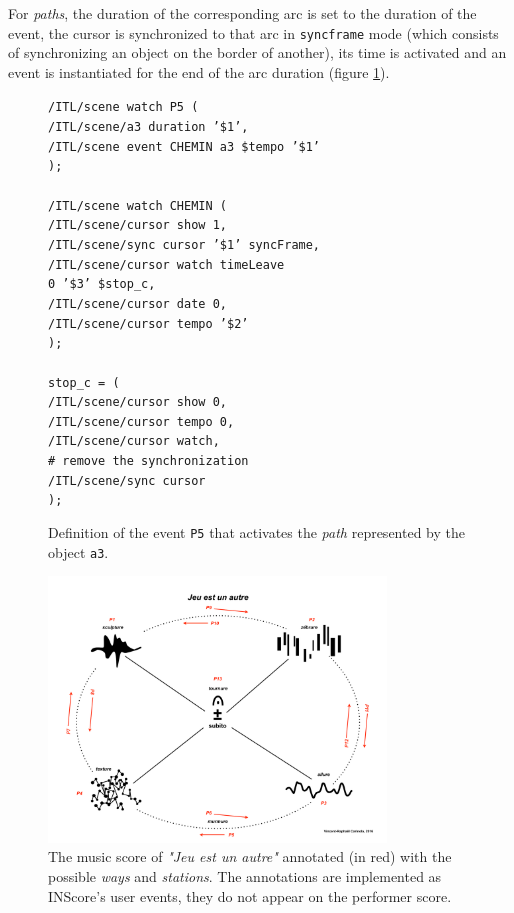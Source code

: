 \documentclass{article}
\newcommand{\OSC}[1]	{{\fontsize{9pt}{9pt} \selectfont\texttt{#1}}}
\newcommand{\tab}{\hspace*{4mm}}
\newcommand{\sample}[1]		{\vspace{-0.2em}\begin{center}\colorbox{mygrey}{\begin{minipage}[t]{0.98\columnwidth} {\small \texttt{#1}}\end{minipage}}\end{center}}
\begin{document}
For \emph{paths}, the duration of the corresponding arc is set to the duration of the event, the cursor is synchronized to that arc in \OSC{syncframe} mode (which consists of synchronizing an object on the border of another), its time is activated and an event is instantiated for the end of the arc duration (figure \ref{fig:path}).
\begin{figure}[h]
   \centering
\sample{/ITL/scene watch P5 ( \\
\tab/ITL/scene/a3 duration '\$1', \\
\tab/ITL/scene event CHEMIN a3 \$tempo '\$1' \\
); \\
\\
/ITL/scene watch CHEMIN ( \\
\tab/ITL/scene/cursor show 1,\\
\tab/ITL/scene/sync cursor '\$1' syncFrame,\\
\tab/ITL/scene/cursor watch timeLeave \\
\hspace*{30mm}0 '\$3' \$stop\_c,\\
\tab/ITL/scene/cursor date 0,\\
\tab/ITL/scene/cursor tempo '\$2'\\
); \\
\\
stop\_c = ( \\
\tab/ITL/scene/cursor show 0,\\
\tab/ITL/scene/cursor tempo 0, \\
\tab/ITL/scene/cursor watch,  \\
\tab\# remove the synchronization \\
\tab/ITL/scene/sync cursor \\
);
}
   \caption{Definition of the event \OSC{P5} that activates the \emph{path} represented by the object \OSC{a3}.}
   \label{fig:path}
\end{figure}

\begin{figure}[ht]
   \centering
   \includegraphics[width=0.8\textwidth]{imgs/jeu}
   \caption{The music score of \emph{"Jeu est un autre"} annotated (in red) with the possible \emph{ways} and \emph{stations}. The annotations are implemented as INScore's user events, they do not appear on the performer score.}
   \label{fig:sample}
\end{figure}
\end{document}
